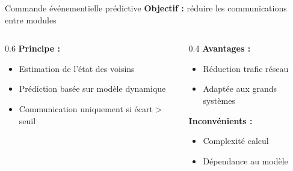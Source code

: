 \begin{frame}[c]{Commande événementielle prédictive}
    \vfill
    \textbf{Objectif :} réduire les communications entre modules
    
    \vspace{0.3cm}
    
    \begin{columns}[T]
        \begin{column}{0.6\textwidth}
            \textbf{Principe :}
            \begin{itemize}
                \item Estimation de l'état des voisins
                \item Prédiction basée sur modèle dynamique
                \item Communication uniquement si écart > seuil
            \end{itemize}
            
        
        \end{column}
        \begin{column}{0.4\textwidth}
            \textbf{Avantages :}
            \begin{itemize}
                \item Réduction trafic réseau
                \item Adaptée aux grands systèmes
            \end{itemize}
            
            \vspace{0.3cm}
            \textbf{Inconvénients :}
            \begin{itemize}
                \item Complexité calcul
                \item Dépendance au modèle
            \end{itemize}
        \end{column}
    \end{columns}
    
    \vfill
\end{frame}

